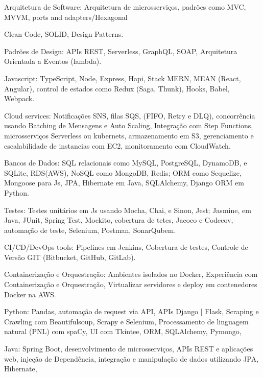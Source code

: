 \documentclass[a4paper,10pt]{article}
\begin{document}
\textcolor{corSubSection}{Arquitetura de Software:}
Arquitetura de microsserviços, 
padrões como MVC, MVVM, ports and adapters/Hexagonal

Clean Code, SOLID, Design Patterns.

\textcolor{corSubSection}{Padrões de Design:}
APIs REST, Serverless, GraphQL, SOAP,
Arquitetura Orientada a Eventos (lambda).

\textcolor{corSubSection}{Javascript:}
TypeScript, Node, Express, Hapi,
Stack MERN, MEAN (React, Angular),
control de estados como Redux (Saga, Thunk), Hooks,
Babel, Webpack.

\textcolor{corSubSection}{Cloud services:}
Notificações SNS,
filas SQS, (FIFO, Retry e DLQ),
concorrência usando Batching de Mensagens e Auto Scaling,
Integração com Step Functions,
microsserviços Serverless ou kubernets,
armazenamento em S3,
gerenciamento e escalabilidade de instancias com EC2,
monitoramento com CloudWatch.

\textcolor{corSubSection}{Bancos de Dados:}
SQL relacionais como
MySQL, PostgreSQL, DynamoDB, e SQLite, RDS(AWS),
NoSQL como
MongoDB, Redis;
ORM como
Sequelize, Mongoose para Js,
JPA, Hibernate em Java, SQLAlchemy,
Django ORM em Python.

\textcolor{corSubSection}{Testes:}
Testes unitários em Js usando Mocha,
Chai, e Sinon, Jest; Jasmine,
em Java, JUnit, Spring Test, Mockito,
cobertura de tetes, Jacoco e Codecov,
automação de teste, Selenium, Postman,
SonarQubem.


\textcolor{corSubSection}{CI/CD/DevOps tools:}
Pipelines em Jenkins,
Cobertura de testes,
Controle de Versão GIT (Bitbucket, GitHub, GitLab).

\textcolor{corSubSection}{Containerização e Orquestração:}
Ambientes isolados no Docker,
Experiência com Containerização e Orquestração,
Virtualizar servidores e deploy em
contenedores Docker na AWS.

\textcolor{corSubSection}{Python:}
Pandas,
automação de request via API,
APIs Django | Flask,
Scraping e Crawling com Beautifulsoup,
Scrapy e Selenium,
Processamento de linguagem natural (PNL) com spaCy,
UI com Tkintee,
ORM, SQLAlchemy, Pymongo,

\textcolor{corSubSection}{Java:}
Spring Boot, desenvolvimento de microsserviços, APIs REST e aplicações web,
injeção de Dependência,
integração e manipulação de dados utilizando
JPA, Hibernate,
\end{document}
